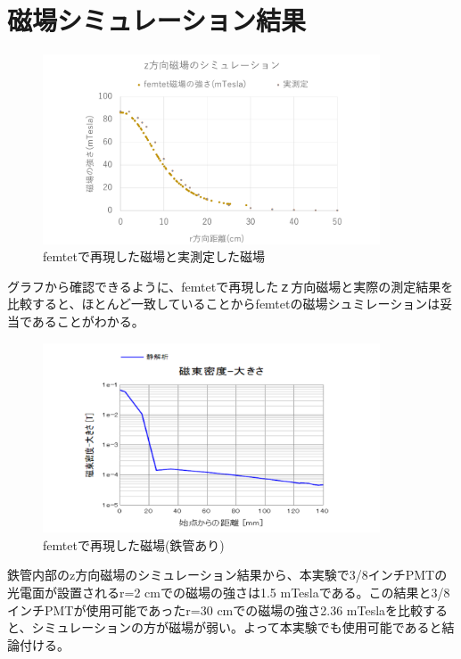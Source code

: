 \section{磁場シミュレーション結果}
\begin{figure}[H]
	\centering
		\includegraphics[width=10cm]{fig/iguchi/femtetgraph.pdf}
	\caption{femtetで再現した磁場と実測定した磁場}
	\label{femtegraph}
\end{figure}

グラフから確認できるように、femtetで再現したｚ方向磁場と実際の測定結果を比較すると、ほとんど一致していることからfemtetの磁場シュミレーションは妥当であることがわかる。
\begin{figure}[H]
	\centering
		\includegraphics[width=10cm]{fig/iguchi/maggraphinFe.pdf}
	\caption{femtetで再現した磁場(鉄管あり)}
	\label{maggraphinFe}
\end{figure}
鉄管内部のz方向磁場のシミュレーション結果から、本実験で3/8インチPMTの光電面が設置されるr=2 cmでの磁場の強さは1.5 mTeslaである。この結果と3/8インチPMTが使用可能であったr=30 cmでの磁場の強さ2.36 mTeslaを比較すると、シミュレーションの方が磁場が弱い。よって本実験でも使用可能であると結論付ける。




